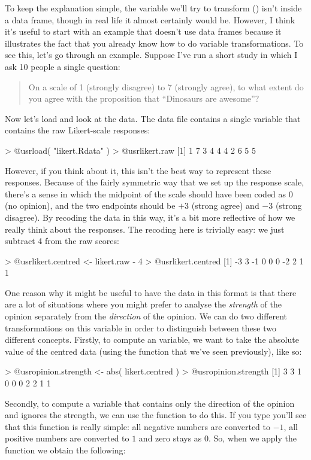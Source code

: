 To keep the explanation simple, the variable we'll try to transform () isn't inside a data frame, though in real life it almost certainly would be. However, I think it's useful to start with an example that doesn't use data frames because it illustrates the fact that you already know how to do variable transformations. To see this, let's go through an example. Suppose I've run a short study in which I ask 10 people a single question: 
\begin{quote}
On a scale of 1 (strongly disagree) to 7 (strongly agree), to what extent do you agree with the proposition that ``Dinosaurs are awesome''?
\end{quote}
Now let's load and look at the data. The data file  contains a single variable that contains the raw Likert-scale responses:
\begin{rblock1}
> @usr{load( "likert.Rdata" )}
> @usr{likert.raw}
 [1] 1 7 3 4 4 4 2 6 5 5
\end{rblock1}
However, if you think about it, this isn't the best way to represent these responses.   Because of the fairly symmetric way that we set up the response scale, there's a sense in which the midpoint of the scale should have been coded as 0 (no opinion), and the two endpoints should be $+3$ (strong agree) and $-3$ (strong disagree). By recoding the data in this way, it's a bit more reflective of how we really think about the responses. The recoding here is trivially easy: we just subtract 4 from the raw scores:
\begin{rblock1}
> @usr{likert.centred <- likert.raw - 4}
> @usr{likert.centred}
 [1] -3  3 -1  0  0  0 -2  2  1  1
\end{rblock1}
One reason why it might be useful to have the data in this format is that there are a lot of situations where you might prefer to analyse the {\it strength} of the opinion separately from the {\it direction} of the opinion. We can do two different transformations on this  variable in order to distinguish between these two different concepts. Firstly, to compute an  variable, we want to take the absolute value of the centred data (using the  function that we've seen previously), like so:
\begin{rblock1}
> @usr{opinion.strength <- abs( likert.centred )}
> @usr{opinion.strength}
 [1] 3 3 1 0 0 0 2 2 1 1
\end{rblock1}
Secondly, to compute a variable that contains only the direction of the opinion and ignores the strength, we can use the  function to do this. If you type  you'll see that this function is really simple: all negative numbers are converted to $-1$, all positive numbers are converted to $1$ and zero stays as $0$. So, when we apply the  function we obtain the following:

